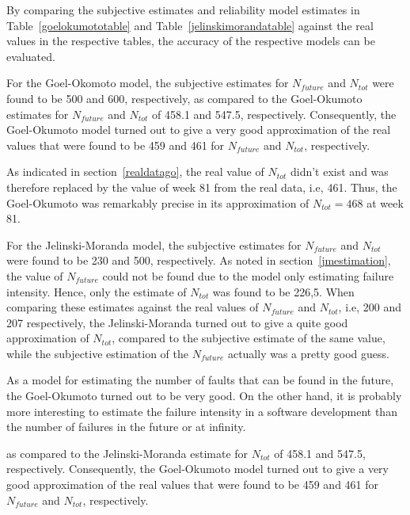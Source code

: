 By comparing the subjective estimates and reliability model estimates in Table~\ref{goelokumototable} and Table~\ref{jelinskimorandatable} against the real values in the respective tables, the accuracy of the respective models can be evaluated. 

For the Goel-Okomoto model, the subjective estimates for $N_{future}$ and $N_{tot}$ were found to be 500 and 600, respectively, as compared to the Goel-Okumoto estimates for $N_{future}$ and $N_{tot}$ of 458.1 and 547.5, respectively. Consequently, the Goel-Okumoto model turned out to give a very good approximation of the real values that were found to be 459 and 461 for $N_{future}$ and $N_{tot}$, respectively. 

As indicated in section~\ref{realdatago}, the real value of $N_{tot}$ didn't exist and was therefore replaced by the value of week 81 from the real data, i.e, 461. Thus, the Goel-Okumoto was remarkably precise in its approximation of $N_{tot}=468$ at week 81. 

For the Jelinski-Moranda model, the subjective estimates for $N_{future}$ and $N_{tot}$ were found to be 230 and 500, respectively. As noted in section~\ref{jmestimation}, the value of $N_{future}$ could not be found due to the model only estimating failure intensity. Hence, only the estimate of $N_{tot}$ was found to be 226,5. When comparing these estimates against the real values of $N_{future}$ and $N_{tot}$, i.e, 200 and 207 respectively, the Jelinski-Moranda turned out to give a quite good approximation of $N_{tot}$, compared to the subjective estimate of the same value, while the subjective estimation of the $N_{future}$ actually was a pretty good guess. 

As a model for estimating the number of faults that can be found in the future, the Goel-Okumoto turned out to be very good. On the other hand, it is probably more interesting to estimate the failure intensity in a software development than the number of failures in the future or at infinity. 



 as compared to the Jelinski-Moranda estimate for $N_{tot}$ of 458.1 and 547.5, respectively. Consequently, the Goel-Okumoto model turned out to give a very good approximation of the real values that were found to be 459 and 461 for $N_{future}$ and $N_{tot}$, respectively. 

